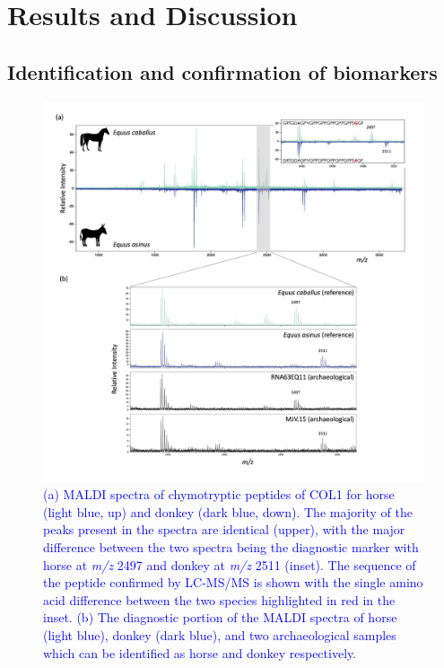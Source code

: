 \documentclass[preprint, 3p, authoryear]{elsarticle} %
\begin{document}
\hypertarget{results-and-discussion}{%
\section{Results and Discussion}\label{results-and-discussion}}

\hypertarget{identification-and-confirmation-of-biomarkers}{%
\subsection{Identification and confirmation of biomarkers}\label{identification-and-confirmation-of-biomarkers}}



\begin{figure}
\includegraphics[width=1\linewidth]{../img/equid_marker} \caption{\textcolor{blue}{(a) MALDI spectra of chymotryptic peptides of COL1 for horse (light blue, up) and donkey (dark blue, down). The majority of the peaks present in the spectra are identical (upper), with the major difference between the two spectra being the diagnostic marker with horse at \emph{m/z} 2497 and donkey at \emph{m/z} 2511 (inset). The sequence of the peptide confirmed by LC-MS/MS is shown with the single amino acid difference between the two species highlighted in red in the inset. (b) The diagnostic portion of the MALDI spectra of horse (light blue), donkey (dark blue), and two archaeological samples which can be identified as horse and donkey respectively.}}\label{fig:equidmarkerplot}
\end{figure}
\end{document}
